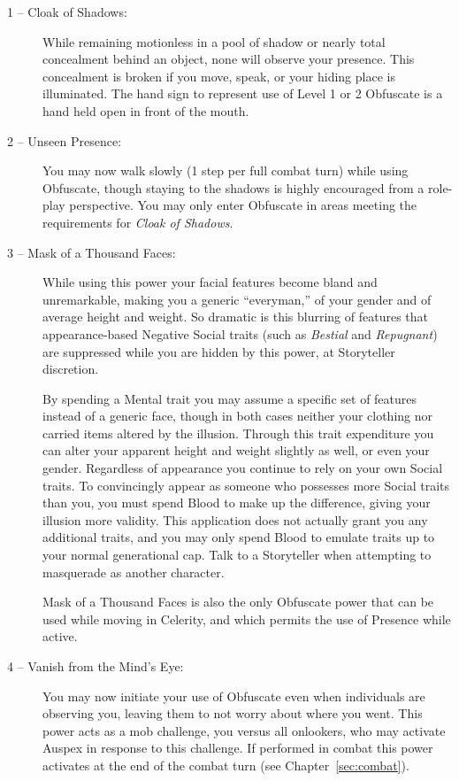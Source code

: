 \begin{description}
	\item[1 -- Cloak of Shadows:]  While remaining motionless in a pool of shadow or nearly total concealment 
	behind an object, none will observe your presence.  This concealment is broken if you move, speak, 
	or your hiding place is illuminated.  The hand sign to represent use of Level 1 or 2 Obfuscate is a 
	hand held open in front of the mouth.
	\item[2 -- Unseen Presence:]  You may now walk slowly (1 step per full combat turn) while using 
	Obfuscate, though staying to the shadows is highly encouraged from a role-play perspective.  You may 
	only enter Obfuscate in areas meeting the requirements for \emph{Cloak of Shadows}.
	\item[3 -- Mask of a Thousand Faces:]  While using this power your facial features become bland 
	and unremarkable, making you a generic ``everyman,'' of your gender and of average height and weight.  
	So dramatic is this blurring of features that appearance-based Negative Social traits (such as 
	\emph{Bestial} and \emph{Repugnant}) are suppressed while you are hidden by this power, at Storyteller 
	discretion.
	
	By spending a Mental trait you may assume a specific set of features instead of a generic face, though in 
	both cases neither your clothing nor carried items altered by the illusion.  Through this trait expenditure 
	you can alter your apparent height and weight slightly as well, or even your gender.  Regardless of 
	appearance you continue to rely on your own Social traits.  To convincingly appear as someone who possesses 
	more Social traits than you, you must spend Blood to make up the difference, giving your illusion more 
	validity. This application 	does not actually grant you any additional traits, and you may only spend 
	Blood to emulate traits up to your normal generational cap.  Talk to a Storyteller when attempting to 
	masquerade as another character.

	Mask of a Thousand Faces is also the only Obfuscate  power that can be used while moving in Celerity, 
	and which permits the use of Presence while active.
	\item[4 -- Vanish from the Mind's Eye:]  You may now initiate your use of Obfuscate even when individuals 
	are observing you, leaving them to not worry about where you went.  This power acts as a mob challenge, 
	you versus all onlookers, who may activate Auspex in response to this challenge.  If performed in combat 
	this power activates at the end of the combat turn (see Chapter~\ref{sec:combat}).  
	

\end{description}
